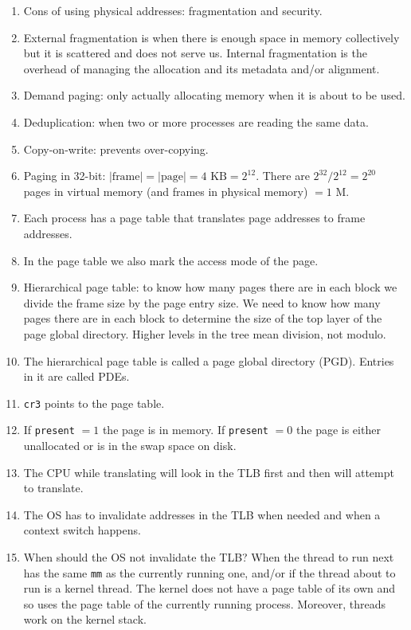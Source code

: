 \documentclass[12pt,a4paper]{article}
\begin{document}
\begin{enumerate}
  \item Cons of using physical addresses: fragmentation and security.
  \item External fragmentation is when there is enough space in memory collectively but it is scattered and does not serve us. Internal fragmentation is the overhead of managing the allocation and its metadata and/or alignment.
  \item Demand paging: only actually allocating memory when it is about to be used.
  \item Deduplication: when two or more processes are reading the same data.
  \item Copy-on-write: prevents over-copying.
  \item Paging in 32-bit: $|\text{frame}| = |\text{page}| = 4 \text{ KB} = 2^{12}$. There are $2^{32}/2^{12} = 2^{20}$ pages in virtual memory (and frames in physical memory) $= 1$ M.
  \item Each process has a page table that translates page addresses to frame addresses.
  \item In the page table we also mark the access mode of the page.
  \item Hierarchical page table: to know how many pages there are in each block we divide the frame size by the page entry size. We need to know how many pages there are in each block to determine the size of the top layer of the page global directory. Higher levels in the tree mean division, not modulo.
  \item The hierarchical page table is called a page global directory (PGD). Entries in it are called PDEs.
  \item \texttt{cr3} points to the page table.
  \item If \texttt{present} $= 1$ the page is in memory. If \texttt{present} $= 0$ the page is either unallocated or is in the swap space on disk.
  \item The CPU while translating will look in the TLB first and then will attempt to translate.
  \item The OS has to invalidate addresses in the TLB when needed and when a context switch happens.
  \item When should the OS not invalidate the TLB? When the thread to run next has the same \texttt{mm} as the currently running one, and/or if the thread about to run is a kernel thread. The kernel does not have a page table of its own and so uses the page table of the currently running process. Moreover, threads work on the kernel stack.
\end{enumerate}
\end{document}
